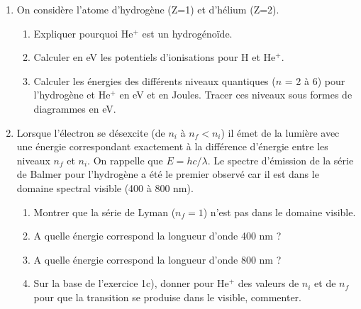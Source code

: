 \begin{enumerate}[\bf 1)]
\item On consid\`ere l'atome d'hydrog\`ene (Z=1) et d'h\'elium (Z=2).
\begin{enumerate}
\item Expliquer pourquoi He$^+$ est un hydrog\'eno\"ide.
\item Calculer en eV les potentiels d'ionisations pour H et He$^+$.
\item Calculer les \'energies des diff\'erents niveaux quantiques ($n$ = 2 \`a 6) pour l'hydrog\`ene et He$^+$
en eV et en Joules. Tracer ces niveaux sous formes de diagrammes en eV.
\end{enumerate}

\item Lorsque l'\'electron se d\'esexcite (de $n_i$ \`a $n_f < n_i$) il \'emet de la lumi\`ere avec
une \'energie correspondant exactement \`a la diff\'erence d'\'energie entre les niveaux $n_f$ et $n_i$.
On rappelle que $E=hc/\lambda$. Le spectre d'\'emission de la s\'erie de Balmer pour l'hydrog\`ene
a \'et\'e le premier observ\'e car il est dans le domaine spectral visible (400 \`a 800 nm).
\begin{enumerate}
\item Montrer que la s\'erie de Lyman ($n_f =1$) n'est pas dans le domaine visible.
\item A quelle \'energie correspond la longueur d'onde 400 nm ?
\item A quelle \'energie correspond la longueur d'onde 800 nm ?
\item Sur la base de l'exercice 1c), donner pour He$^+$ des valeurs de $n_i$ et de $n_f$ pour
que la transition se produise dans le visible, commenter.
\end{enumerate}

\end{enumerate}

